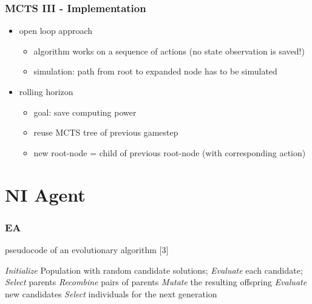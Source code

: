 \documentclass{beamer}
\begin{document}
\begin{frame}
\frametitle{MCTS III - Implementation}
\begin{itemize}
\item open loop approach
 	\begin{itemize}
 		\item algorithm works on a sequence of actions (no state observation is saved!)
 		\item simulation: path from root to expanded node has to be simulated
 	\end{itemize}
 	\item rolling horizon
 	\begin{itemize}
 		\item goal: save computing power
 		\item reuse MCTS tree of previous gamestep
 		\item new root-node = child of previous root-node (with corresponding action)
 	\end{itemize}
\end{itemize}
\end{frame}



\section{NI Agent}

\begin{frame}
\frametitle{EA}

\begin{algorithm}[H]
\caption{pseudocode of an evolutionary algorithm [3]}
\begin{algorithmic}[1]

\STATE \emph{Initialize} Population with random candidate solutions;
\STATE \emph{Evaluate} each candidate;
\STATE \emph{Select} parents 
\STATE \emph{Recombine} pairs of parents
\STATE \emph{Mutate} the resulting offspring
\STATE \emph{Evaluate} new candidates
\STATE \emph{Select} individuals for the next generation
\ENDWHILE
\end{algorithmic}
\label{alg:seq}
\end{algorithm}


\end{frame}
\end{document}
